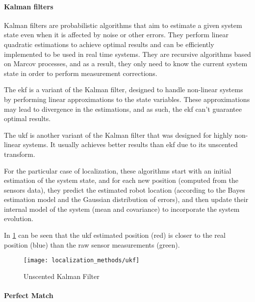 \paragraph{Kalman filters}

Kalman filters \cite{Kalman1960} are probabilistic algorithms that aim to estimate a given system state even when it is affected by noise or other errors. They perform linear quadratic estimations to achieve optimal results and can be efficiently implemented to be used in real time systems. They are recursive algorithms based on Marcov processes, and as a result, they only need to know the current system state in order to perform measurement corrections.

The \gls{ekf} \cite{Einicke1999,Ribeiro2004,Ivanjko2010,Liu2011} is a variant of the Kalman filter, designed to handle non-linear systems by performing linear approximations to the state variables. These approximations may lead to divergence in the estimations, and as such, the \gls{ekf} can't guarantee optimal results.

The \gls{ukf} \cite{Julier1997,Wan2002} is another variant of the Kalman filter that was designed for highly non-linear systems. It usually achieves better results than \gls{ekf} due to its unscented transform.

For the particular case of localization, these algorithms start with an initial estimation of the system state, and for each new position (computed from the sensors data), they predict the estimated robot location (according to the Bayes estimation model and the Gaussian distribution of errors), and then update their internal model of the system (mean and covariance) to incorporate the system evolution.

In \cref{fig:localization-methods_ukf} can be seen that the \gls{ukf} estimated position (red) is closer to the real position (blue) than the raw sensor measurements (green).

\begin{figure}[h]
	\centering
	\texttt{[image: localization\_methods/ukf]}
	\caption{Unscented Kalman Filter\protect\footnotemark}
	\label{fig:localization-methods_ukf}
\end{figure}

\paragraph{Perfect Match}

